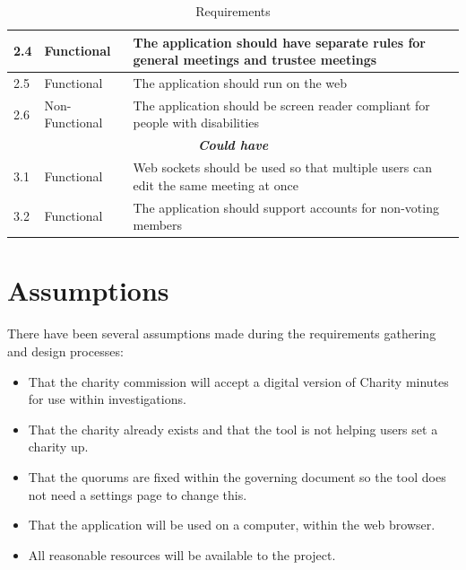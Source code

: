 \documentclass{UoYCSproject}
\begin{document}
\begin{table}[htb]
\begin{center}
{\begin{tabular}{|p{}|p{}|p{}|}
2.4   &   Functional   & 
             The application should have separate rules for general meetings and trustee meetings   \\\hline
2.5   &   Functional   & 
             The application should run on the web   \\\hline
2.6   &   Non-Functional   & 
             The application should be screen reader compliant for people with disabilities   \\\hline
 \multicolumn{3}{|c|}{\textit{\textbf{Could have}}} \\\hline
3.1   &   Functional   & 
             Web sockets should be used so that multiple users can edit the same meeting at once   \\\hline
3.2   &   Functional   & 
             The application should support accounts for non-voting members   \\\hline
\end{tabular}
}
\caption{Requirements}
\end{center}
\end{table}



\section{Assumptions}
There have been several assumptions made during the requirements gathering and design processes:
\begin{itemize}[noitemsep]
  \item That the charity commission will accept a digital version of Charity minutes for use within investigations.
  \item That the charity already exists and that the tool is not helping users set a charity up.
  \item That the quorums are fixed within the governing document so the tool does not need a settings page to change this.
  \item That the application will be used on a computer, within the web browser.
  \item All reasonable resources will be available to the project.
\end{itemize}
\end{document}
